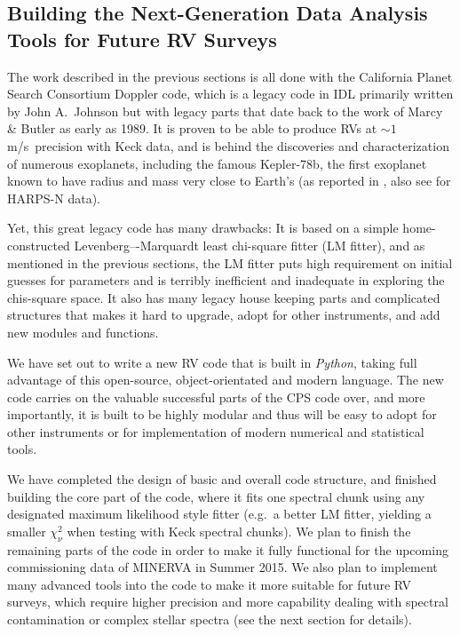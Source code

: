 \documentclass[12pt]{article}
\def\mps{m/s}
\begin{document}
\vspace{-10pt}
\subsection{Building the Next-Generation Data Analysis Tools for Future RV Surveys}\label{sec:newrv}
\vspace{-5pt}

The work described in the previous sections is all done with the
California Planet Search Consortium Doppler code, which is a legacy
code in IDL primarily written by John A.\ Johnson but with legacy
parts that date back to the work of Marcy \& Butler as early as
1989. It is proven to be able to produce RVs at $\sim 1$
\mps\ precision with Keck data, and is behind the discoveries and
characterization of numerous exoplanets, including the famous
Kepler-78b, the first exoplanet known to have radius and mass very
close to Earth's (as reported in \citealt{howard2013}, also see
\citealt{pepe2013} for HARPS-N data).

Yet, this great legacy code has many drawbacks: It is based on a
simple home-constructed Levenberg–-Marquardt least chi-square fitter
(LM fitter), and as mentioned in the previous sections, the LM fitter
puts high requirement on initial guesses for parameters and is
terribly inefficient and inadequate in exploring the chis-square
space. It also has many legacy house keeping parts and complicated
structures that makes it hard to upgrade, adopt for other instruments,
and add new modules and functions.

We have set out to write a new RV code that is built in {\it Python},
taking full advantage of this open-source, object-orientated and
modern language. The new code carries on the valuable successful
parts of the CPS code over, and more importantly, it is built to be
highly modular and thus will be easy to adopt for other instruments or
for implementation of modern numerical and statistical tools.

We have completed the design of basic and overall code structure, and
finished building the core part of the code, where it fits one
spectral chunk using any designated maximum likelihood style fitter
(e.g.\ a better LM fitter, yielding a smaller $\chi^2_\nu$ when
testing with Keck spectral chunks). We plan to finish the remaining
parts of the code in order to make it fully functional for the
upcoming commissioning data of MINERVA in Summer 2015. We also plan
to implement many advanced tools into the code to make it more
suitable for future RV surveys, which require higher precision and
more capability dealing with spectral contamination or complex stellar
spectra (see the next section for details).
\end{document}
